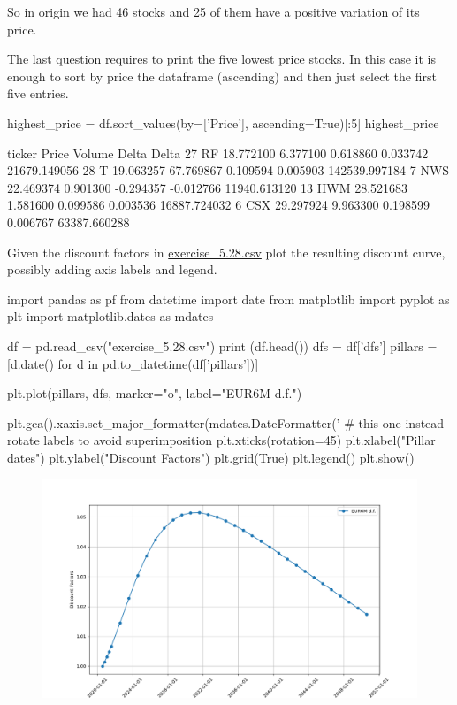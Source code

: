 \begin{solution}
So in origin we had 46 stocks and 25 of them have a positive variation of its price.

The last question requires to print the five lowest price stocks. In this case it is enough to sort by price the dataframe (ascending) and then just select the first five entries.

\begin{ipython}
highest_price = df.sort_values(by=['Price'], ascending=True)[:5]
highest_price
\end{ipython}
\begin{ioutput}
   ticker      Price     Volume     Delta    Delta%
27     RF  18.772100   6.377100  0.618860  0.033742   21679.149056
28      T  19.063257  67.769867  0.109594  0.005903  142539.997184
7     NWS  22.469374   0.901300 -0.294357 -0.012766   11940.613120
13    HWM  28.521683   1.581600  0.099586  0.003536   16887.724032
6     CSX  29.297924   9.963300  0.198599  0.006767   63387.660288
\end{ioutput}
\end{solution}

\begin{question}
Given the discount factors in \href{https://raw.githubusercontent.com/matteosan1/finance_course/master/input_files/exercise_5.28.csv}{exercise\_5.28.csv} plot the resulting discount curve, possibly adding axis labels and legend.
\end{question}

\cprotEnv\begin{solution}
\begin{ipython}
import pandas as pf
from datetime import date
from matplotlib import pyplot as plt
import matplotlib.dates as mdates

df = pd.read_csv("exercise_5.28.csv")
print (df.head())
dfs = df['dfs']
pillars = [d.date() for d in pd.to_datetime(df['pillars'])]

plt.plot(pillars, dfs, marker="o", label="EUR6M d.f.")

plt.gca().xaxis.set_major_formatter(mdates.DateFormatter('%
# this one instead rotate labels to avoid superimposition
plt.xticks(rotation=45)
plt.xlabel("Pillar dates")
plt.ylabel("Discount Factors")
plt.grid(True)
plt.legend()
plt.show()
\end{ipython}

\begin{figure}[htb]
\begin{center}
\includegraphics[width=0.7\linewidth]{figures/ex5.5}
\end{center}
\end{figure}
\end{solution}



